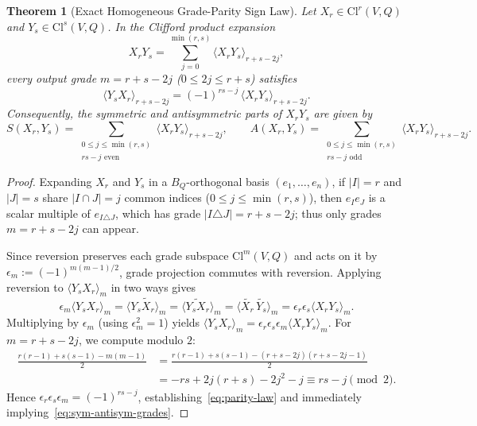 \documentclass[11pt]{article}
\newcommand{\coloneqq}{\mathrel{:=}}
\theoremstyle{plain}
\newtheorem{theorem}{Theorem}[section]
\theoremstyle{definition}
\theoremstyle{remark}
\newcommand{\Cl}{\mathrm{Cl}}
\newcommand{\grade}[2]{\langle #1 \rangle_{#2}}
\begin{document}
\begin{theorem}[Exact Homogeneous Grade-Parity Sign Law]\label{thm:parity}
Let $X_r \in \Cl^r(V, Q)$ and $Y_s \in \Cl^s(V, Q)$. In the Clifford product expansion
\[
  X_r Y_s = \sum_{j = 0}^{\min(r, s)} \grade{X_r Y_s}{r + s - 2j},
\]
every output grade $m = r + s - 2j$ ($0 \le 2j \le r + s$) satisfies
\begin{equation}\label{eq:parity-law}
  \grade{Y_s X_r}{r + s - 2j} = (-1)^{rs - j}\,\grade{X_r Y_s}{r + s - 2j}.
\end{equation}
Consequently, the symmetric and antisymmetric parts of $X_r Y_s$ are given by
\begin{equation}\label{eq:sym-antisym-grades}
  S(X_r, Y_s) = \sum_{\substack{0 \le j \le \min(r, s)\\ rs - j \text{ even}}} \grade{X_r Y_s}{r + s - 2j}, \qquad
  A(X_r, Y_s) = \sum_{\substack{0 \le j \le \min(r, s)\\ rs - j \text{ odd}}} \grade{X_r Y_s}{r + s - 2j}.
\end{equation}
\end{theorem}
\begin{proof}
Expanding $X_r$ and $Y_s$ in a $B_Q$-orthogonal basis $(e_1, \dots, e_n)$, if $|I| = r$ and $|J| = s$ share $|I \cap J| = j$ common indices ($0 \le j \le \min(r, s)$), then $e_I e_J$ is a scalar multiple of $e_{I \triangle J}$, which has grade $|I \triangle J| = r + s - 2j$; thus only grades $m = r + s - 2j$ can appear.

Since reversion preserves each grade subspace $\Cl^m(V, Q)$ and acts on it by $\epsilon_m \coloneqq (-1)^{m(m-1)/2}$, grade projection commutes with reversion. Applying reversion to $\grade{Y_s X_r}{m}$ in two ways gives
\[
  \epsilon_m \grade{Y_s X_r}{m}
  = \widetilde{\grade{Y_s X_r}{m}}
  = \grade{\widetilde{Y_s X_r}}{m}
  = \grade{\widetilde{X_r}\,\widetilde{Y_s}}{m}
  = \epsilon_r \epsilon_s \grade{X_r Y_s}{m}.
\]
Multiplying by $\epsilon_m$ (using $\epsilon_m^2 = 1$) yields $\grade{Y_s X_r}{m} = \epsilon_r \epsilon_s \epsilon_m \grade{X_r Y_s}{m}$. For $m = r + s - 2j$, we compute modulo $2$:
\begin{align*}
  \frac{r(r-1) + s(s-1) - m(m-1)}{2}
  &= \frac{r(r-1) + s(s-1) - (r + s - 2j)(r + s - 2j - 1)}{2}\\
  &= -rs + 2j(r + s) - 2j^2 - j \equiv rs - j \pmod{2}.
\end{align*}
Hence $\epsilon_r \epsilon_s \epsilon_m = (-1)^{rs - j}$, establishing~\eqref{eq:parity-law} and immediately implying~\eqref{eq:sym-antisym-grades}.
\end{proof}
\end{document}

